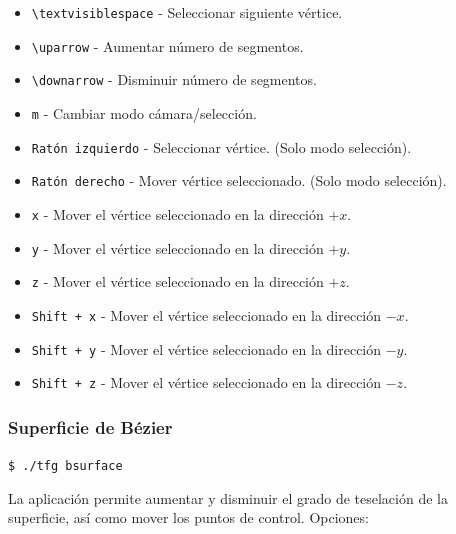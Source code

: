 \begin{itemize}
		\item \verb|\textvisiblespace| - Seleccionar siguiente vértice.
		\item \verb|\uparrow| - Aumentar número de segmentos.
		\item \verb|\downarrow| - Disminuir número de segmentos.
		\item \verb|m| - Cambiar modo cámara/selección.
		\item \verb|Ratón izquierdo| - Seleccionar vértice. (Solo modo
				selección).
		\item \verb|Ratón derecho| - Mover vértice seleccionado. (Solo modo
				selección).
		\item \verb|x| - Mover el vértice seleccionado en la dirección $+x$.
		\item \verb|y| - Mover el vértice seleccionado en la dirección $+y$.
		\item \verb|z| - Mover el vértice seleccionado en la dirección $+z$.
		\item \verb|Shift + x| - Mover el vértice seleccionado en la dirección $-x$.
		\item \verb|Shift + y| - Mover el vértice seleccionado en la dirección $-y$.
		\item \verb|Shift + z| - Mover el vértice seleccionado en la dirección $-z$.
\end{itemize}

\subsubsection{Superficie de Bézier}

\verb|$ ./tfg bsurface|

La aplicación permite aumentar y disminuir el grado de teselación de la
superficie, así como mover los puntos de control.  
Opciones:

